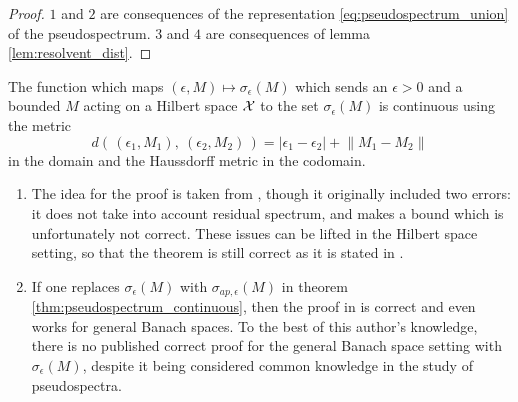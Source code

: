 \begin{proof}
    $1$ and $2$ are consequences of the representation \ref{eq:pseudospectrum_union} of 
    the pseudospectrum. $3$ and $4$ are consequences of lemma \ref{lem:resolvent_dist}. 
\end{proof}

\begin{theorem}
    \label{thm:pseudospectrum_continuous}
    The function which maps $(\epsilon, M) \mapsto \sigma_\epsilon (M)$ which sends an 
    $\epsilon > 0$ and a bounded $M$ acting on a Hilbert space $\mathcal{X}$ to the set 
    $\sigma_\epsilon (M)$ is continuous using the metric 
    \begin{equation}
        d(\, (\epsilon_1, M_1),\ (\epsilon_2, M_2) \,) 
        = | \epsilon_1 - \epsilon_2 | + \left\| M_1 - M_2 \right\|
    \end{equation}
    in the domain and the Haussdorff metric in the codomain. 
\end{theorem}

\begin{remark}
    \begin{enumerate}
        \item The idea for the proof is taken from
        \cite{pseudospectrum_continuous}, though it originally included two
        errors: it does not take into account residual spectrum, and makes a
        bound which is unfortunately not correct. These issues can be lifted in
        the Hilbert space setting, so that the theorem is still correct as it is
        stated in \cite{pseudospectrum_continuous}. 
        \item If one replaces $\sigma_\epsilon (M)$ with $\sigma_{ap, \epsilon}
        (M)$ in theorem \ref{thm:pseudospectrum_continuous}, then the proof in
        \cite{pseudospectrum_continuous} is correct and even works for general
        Banach spaces. To the best of this author's knowledge, there is no
        published correct proof for the general Banach space setting with 
        $\sigma_\epsilon (M)$, despite it being
        considered common knowledge in the study of pseudospectra. 
    \end{enumerate}
\end{remark}

